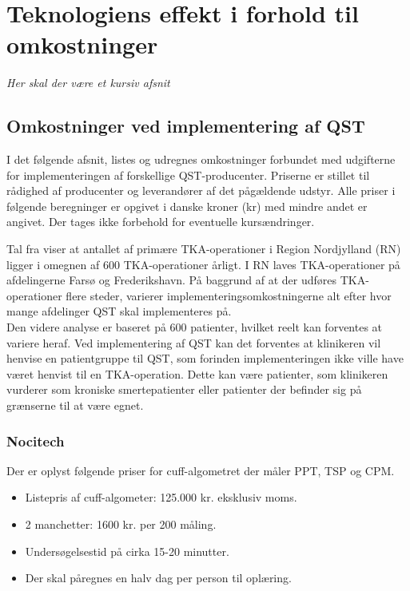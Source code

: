 \section{Teknologiens effekt i forhold til omkostninger}
\label{priser}
\textit{Her skal der være et kursiv afsnit}


\subsection{Omkostninger ved implementering af QST}
I det følgende afsnit, listes og udregnes omkostninger forbundet med udgifterne for implementeringen af forskellige QST-producenter. Priserne er stillet til rådighed af producenter og leverandører af det pågældende udstyr. Alle priser i følgende beregninger er opgivet i danske kroner (kr) med mindre andet er angivet. Der tages ikke forbehold for eventuelle kursændringer. 


Tal fra  viser at antallet af primære TKA-operationer i Region Nordjylland (RN) ligger i omegnen af 600 TKA-operationer årligt.\citep{aarsrapport2016} I RN laves TKA-operationer på afdelingerne Farsø og Frederikshavn. På baggrund af at der udføres TKA-operationer flere steder, varierer implementeringsomkostningerne alt efter hvor mange afdelinger QST skal implementeres på. \\
Den videre analyse er baseret på 600 patienter, hvilket reelt kan forventes at variere heraf. Ved implementering af QST kan det forventes at klinikeren vil henvise en patientgruppe til QST, som forinden implementeringen ikke ville have været henvist til en TKA-operation. Dette kan være patienter, som klinikeren vurderer som kroniske smertepatienter eller patienter der befinder sig på grænserne til at være egnet. 




\subsubsection{Nocitech}
Der er oplyst følgende priser for cuff-algometret der måler PPT, TSP og CPM.


\begin{itemize}  
\item Listepris af cuff-algometer: 125.000 kr. eksklusiv moms.
\item 2 manchetter: 1600 kr. per 200 måling.
\item Undersøgelsestid på cirka 15-20 minutter.
\item Der skal påregnes en halv dag per person til oplæring.
\end{itemize}



